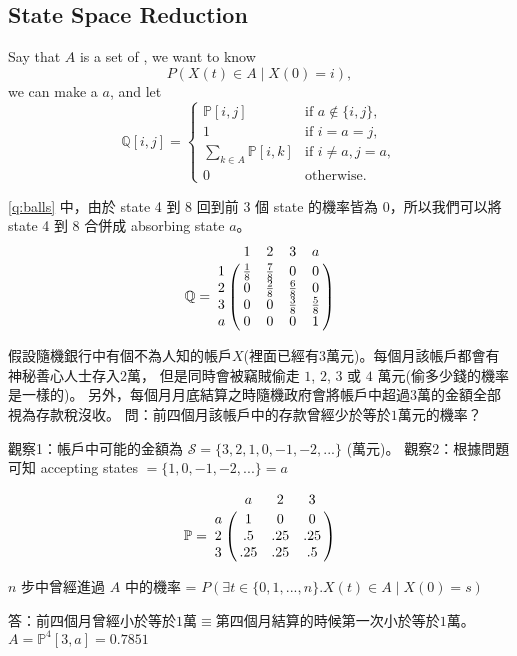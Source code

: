 \subsection{State Space Reduction}

Say that $ A $ is a set of , we want to know
\[ P(X(t) \in A \mid X(0) = i), \]
we can make a  $ a $, and let
\[ \mathbb{Q}[i, j] = \begin{cases}
  \mathbb{P}[i, j]                & \text{if } a \not\in \{i, j\}, \\
  1                               & \text{if } i = a = j, \\
  \sum_{k \in A} \mathbb{P}[i, k] & \text{if } i \neq a, j = a, \\
  0                               & \text{otherwise.}
\end{cases} \]

\begin{comment}
An accepting states, $ A $, is built according to the question. 
\end{comment}

\begin{example}
\autoref{q:balls} 中，由於 state 4 到 8 回到前 3 個 state 的機率皆為 0，所以我們可以將 state 4 到 8 合併成 absorbing state $ a $。
\[ \mathbb{Q} = \bordermatrix{
    & 1 & 2 & 3 & a \cr
  1 & \frac{1}{8} & \frac{7}{8} & 0 & 0 \cr
  2 & 0 & \frac{2}{8} & \frac{6}{8} & 0 \cr
  3 & 0 & 0 & \frac{3}{8} & \frac{5}{8} \cr
  a & 0 & 0 & 0 & 1 \cr
} \]
\end{example}

\begin{example}
假設隨機銀行中有個不為人知的帳戶$X$(裡面已經有$3$萬元)。每個月該帳戶都會有神秘善心人士存入$2$萬，
但是同時會被竊賊偷走 $1$, $2$, $3$ 或 $4$ 萬元(偷多少錢的機率是一樣的)。
另外，每個月月底結算之時隨機政府會將帳戶中超過$3$萬的金額全部視為存款稅沒收。
問：前四個月該帳戶中的存款曾經少於等於$1$萬元的機率？

觀察1：帳戶中可能的金額為 $\mathcal{S} = \{3,2,1,0,-1,-2,...\}$ (萬元)。
觀察2：根據問題可知 accepting states $=\{1,0,-1,-2,...\} = a$

\[ \mathbb{P} = \bordermatrix{
    & a   & 2   & 3   \cr
  a & 1   & 0   & 0   \cr
  2 & .5  & .25 & .25 \cr
  3 & .25 & .25 & .5 
} \]

$n$ 步中曾經進過 $A$ 中的機率 = $P(\exists t \in \{0,1,...,n\} . X(t)\in A \mid X(0) = s)$

答：前四個月曾經小於等於$1$萬$\equiv$第四個月結算的時候第一次小於等於$1$萬。$A = \mathbb{P}^4[3,a] = 0.7851$

\end{example}